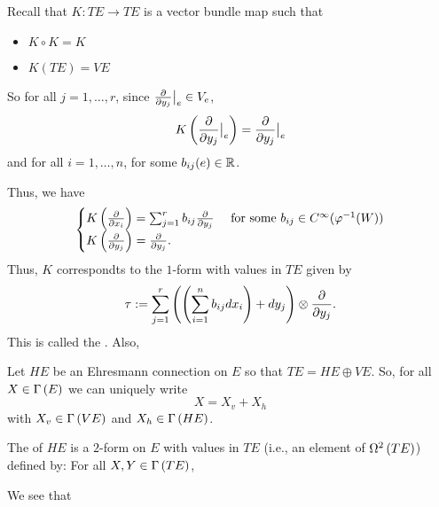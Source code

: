 \documentclass[main.tex]{subfiles}
\begin{document}
    Recall that $K: TE \to TE$ is a vector bundle map such that
    \begin{itemize}
      \item $K \circ K = K$
      \item $K(TE) = VE$
    \end{itemize}

    So for all $j=1,\dots, r$, since $\frac{ \partial  }{ \partial y_j }\big|_{e} \in V_e$,
    \[
    K\left(  \frac{ \partial  }{ \partial y_j }\big|_{e}  \right) = \frac{ \partial  }{ \partial y_j }\big|_{e}
    \]
    and for all $i = 1,\dots, n$,
     for some $b_{ij}(e) \in \mathbb{R}$.

    Thus, we have
    \[
    \begin{cases}
      K\left( \frac{ \partial  }{ \partial x_i }  \right) = \sum_{j=1}^r b_{ij} \frac{ \partial  }{ \partial y_j } & \text{ for some $b_{ij} \in C^\infty(\varphi^{-1}(W))$} \\
      K\left(  \frac{ \partial  }{ \partial y_j }  \right) = \frac{ \partial  }{ \partial y_j }. &
    \end{cases}
    \]
    Thus, $K$ correspondts to the $1$-form with values in $TE$ given by
    \[
      \tau := \sum_{j=1}^r \left(  \left( \sum_{i=1}^n b_{ij} dx_i \right) + dy_j  \right) \otimes \frac{ \partial  }{ \partial y_j }.
    \]
    This is called the . Also,

     Let $HE$ be an Ehresmann connection on $E$ so that $TE = HE \oplus VE$. So, for all $X \in \Gamma\left( E \right)$ we can uniquely write
    \[
    X = X_v + X_h
    \]
    with $X_v \in \Gamma\left( VE \right)$ and $X_h \in \Gamma\left( HE \right)$.

    \begin{defn}
      The  of $HE$ is a $2$-form on $E$ with values in $TE$ (i.e., an element of $\Omega^{2}\left( TE \right)$) defined by: For all $X, Y \in \Gamma\left( TE \right)$,
    \end{defn}

    We see that
\end{document}
